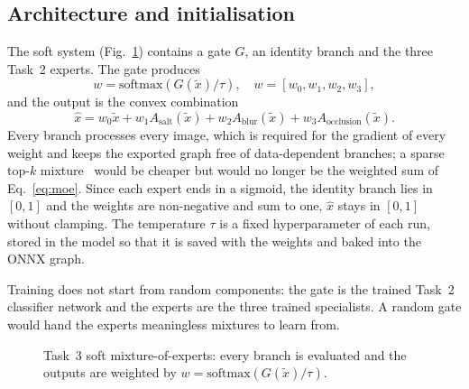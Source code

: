 \documentclass[conference]{IEEEtran}
\begin{document}
\subsection{Architecture and initialisation}
The soft system (Fig.~\ref{fig:task3_arch}) contains a gate $G$, an identity
branch and the three Task~2 experts. The gate produces
\begin{equation}
w = \mathrm{softmax}\!\left(G(\tilde{x})/\tau\right),\quad
w=[w_0,w_1,w_2,w_3],
\end{equation}
and the output is the convex combination
\begin{equation}
\hat{x} = w_0\tilde{x} + w_1A_{\mathrm{salt}}(\tilde{x})
 + w_2A_{\mathrm{blur}}(\tilde{x}) + w_3A_{\mathrm{occlusion}}(\tilde{x}).
\label{eq:moe}
\end{equation}
Every branch processes every image, which is required for the gradient of
every weight and keeps the exported graph free of data-dependent branches;
a sparse top-$k$ mixture~\cite{shazeer2017outrageously} would be cheaper but
would no longer be the weighted sum of Eq.~\eqref{eq:moe}. Since each expert
ends in a sigmoid, the identity branch lies in $[0,1]$ and the weights are
non-negative and sum to one, $\hat{x}$ stays in $[0,1]$ without clamping.
The temperature $\tau$ is a fixed hyperparameter of each run, stored in the
model so that it is saved with the weights and baked into the ONNX graph.

Training does not start from random components: the gate is the trained
Task~2 classifier network and the experts are the three trained
specialists. A random gate would hand the experts meaningless mixtures to
learn from.

\begin{figure}[t]
\centering

\caption{Task~3 soft mixture-of-experts: every branch is evaluated and the
outputs are weighted by $w=\mathrm{softmax}(G(\tilde{x})/\tau)$.}
\label{fig:task3_arch}
\end{figure}
\end{document}
